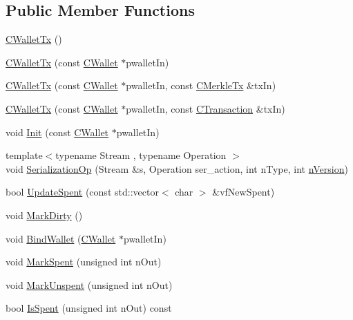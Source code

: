 \subsection*{Public Member Functions}
\begin{DoxyCompactItemize}
\item 
\hyperlink{class_c_wallet_tx_a2124bd17388493a5d883a7ab2cc825b0}{C\+Wallet\+Tx} ()
\item 
\hyperlink{class_c_wallet_tx_a0b1a0f58fbe4c65d47136e1a650cee84}{C\+Wallet\+Tx} (const \hyperlink{class_c_wallet}{C\+Wallet} $\ast$pwallet\+In)
\item 
\hyperlink{class_c_wallet_tx_a8e58ffb8a69ea68fc366b8a53ef345ef}{C\+Wallet\+Tx} (const \hyperlink{class_c_wallet}{C\+Wallet} $\ast$pwallet\+In, const \hyperlink{class_c_merkle_tx}{C\+Merkle\+Tx} \&tx\+In)
\item 
\hyperlink{class_c_wallet_tx_a626a5d41502247ea13b0c90694455468}{C\+Wallet\+Tx} (const \hyperlink{class_c_wallet}{C\+Wallet} $\ast$pwallet\+In, const \hyperlink{class_c_transaction}{C\+Transaction} \&tx\+In)
\item 
void \hyperlink{class_c_wallet_tx_ad207b1e6b355946842a126bc14c7e793}{Init} (const \hyperlink{class_c_wallet}{C\+Wallet} $\ast$pwallet\+In)
\item 
{\footnotesize template$<$typename Stream , typename Operation $>$ }\\void \hyperlink{class_c_wallet_tx_a94e65d0105f2a75a627e374b0bbefe06}{Serialization\+Op} (Stream \&s, Operation ser\+\_\+action, int n\+Type, int \hyperlink{class_c_transaction_a6c29bdd822859c7b21b7b6c22dca6825}{n\+Version})
\item 
bool \hyperlink{class_c_wallet_tx_a49a5151af721410bfb3cf84d241e3228}{Update\+Spent} (const std\+::vector$<$ char $>$ \&vf\+New\+Spent)
\item 
void \hyperlink{class_c_wallet_tx_ac8a376bcb955e437489504dc596b43cf}{Mark\+Dirty} ()
\item 
void \hyperlink{class_c_wallet_tx_ab0ee7347584bff886dc24b9f63ff023c}{Bind\+Wallet} (\hyperlink{class_c_wallet}{C\+Wallet} $\ast$pwallet\+In)
\item 
void \hyperlink{class_c_wallet_tx_af2fc13459e324ad2b3f7c9914d86e7c8}{Mark\+Spent} (unsigned int n\+Out)
\item 
void \hyperlink{class_c_wallet_tx_a15588d9e12497ec4c10a53ab629fa244}{Mark\+Unspent} (unsigned int n\+Out)
\item 
bool \hyperlink{class_c_wallet_tx_a8873e2d46e0b130dea759af55b83a06c}{Is\+Spent} (unsigned int n\+Out) const 

\end{DoxyCompactItemize}
